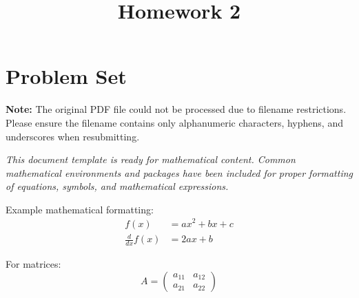 \documentclass[12pt]{article}
\begin{document}
\title{Homework 2}
\author{}
\date{}
\maketitle

\section*{Problem Set}

\textbf{Note:} The original PDF file could not be processed due to filename restrictions. Please ensure the filename contains only alphanumeric characters, hyphens, and underscores when resubmitting.

\vspace{2cm}

\textit{This document template is ready for mathematical content. Common mathematical environments and packages have been included for proper formatting of equations, symbols, and mathematical expressions.}

\vspace{1cm}

Example mathematical formatting:
\begin{align}
    f(x) &= ax^2 + bx + c \\
    \frac{d}{dx}f(x) &= 2ax + b
\end{align}

For matrices:
\begin{equation}
    A = \begin{pmatrix}
        a_{11} & a_{12} \\
        a_{21} & a_{22}
    \end{pmatrix}
\end{equation}
\end{document}
